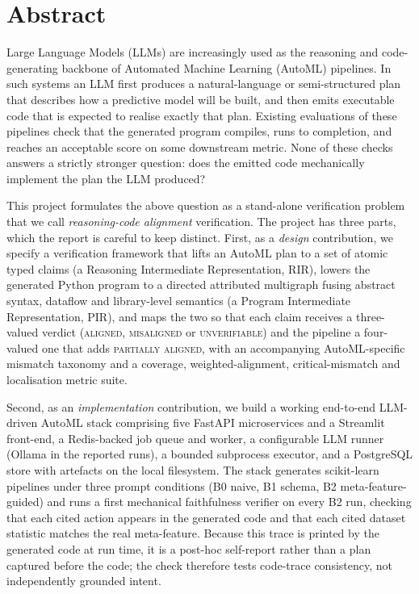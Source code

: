 \chapter*{Abstract}

Large Language Models (LLMs) are increasingly used as the reasoning and
code-generating backbone of Automated Machine Learning (AutoML)
pipelines. In such systems an LLM first produces a natural-language
or semi-structured plan that describes how a predictive model will be
built, and then emits executable code that is expected to realise
exactly that plan. Existing evaluations of these pipelines check that
the generated program compiles, runs to completion, and reaches an
acceptable score on some downstream metric. None of these checks
answers a strictly stronger question: does the emitted code
mechanically implement the plan the LLM produced?

This project formulates the above question as a stand-alone
verification problem that we call \emph{reasoning-code alignment}
verification. The project has three parts, which the report is
careful to keep distinct. First, as a \emph{design} contribution, we
specify a verification framework that lifts an AutoML plan to a set
of atomic typed claims (a Reasoning Intermediate Representation,
RIR), lowers the generated Python program to a directed attributed
multigraph fusing abstract syntax, dataflow and library-level
semantics (a Program Intermediate Representation, PIR), and maps the
two so that each claim receives a three-valued verdict
(\textsc{aligned}, \textsc{misaligned} or \textsc{unverifiable}) and
the pipeline a four-valued one that adds \textsc{partially aligned},
with an accompanying AutoML-specific mismatch taxonomy and a
coverage, weighted-alignment, critical-mismatch and localisation
metric suite.

Second, as an \emph{implementation} contribution, we build a working
end-to-end LLM-driven AutoML stack comprising five FastAPI microservices
and a Streamlit front-end, a Redis-backed job queue and worker, a
configurable LLM runner (Ollama in the reported runs), a bounded
subprocess executor, and a PostgreSQL store with artefacts on the local filesystem. The stack generates
scikit-learn pipelines under three prompt
conditions (B0 naive, B1 schema, B2 meta-feature-guided) and runs a
first mechanical faithfulness verifier on every B2 run, checking that
each cited action appears in the generated code and that each cited
dataset statistic matches the real meta-feature. Because this trace
is printed by the generated code at run time, it is a post-hoc
self-report rather than a plan captured before the code; the check
therefore tests code-trace consistency, not independently grounded
intent.

